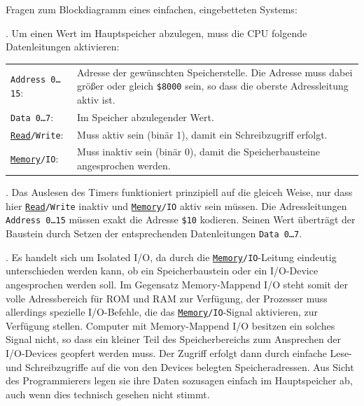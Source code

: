 
Fragen zum Blockdiagramm eines einfachen, eingebetteten Systems:

. Um einen Wert im Hauptspeicher abzulegen, muss die CPU folgende Datenleitungen
aktivieren:

{
    \renewcommand{\arraystretch}{1.5}
    \small

    \begin{tabularx}{\textwidth}{p{}X}
        \texttt{Address 0…15}:
        &
        Adresse der gewünschten Speicherstelle.
        Die Adresse muss dabei größer oder gleich \texttt{\$8000} sein, so dass
        die oberste Adressleitung aktiv ist.
        \\

        \texttt{Data 0…7}:
        &
        Im Speicher abzulegender Wert.
        \\

        \texttt{\underline{Read}/Write}:
        &
        Muss aktiv sein (binär 1), damit ein Schreibzugriff erfolgt.
        \\

        \texttt{\underline{Memory}/IO}:
        &
        Muss inaktiv sein (binär 0), damit die Speicherbausteine
        angesprochen werden.
        \\
    \end{tabularx}
}

. Das Auslesen des Timers funktioniert prinzipiell auf die gleiceh Weise, nur
dass hier \texttt{\underline{Read}/Write} inaktiv und \texttt{\underline{Memory}/IO}
aktiv sein müssen. Die Adressleitungen \texttt{Address 0…15} müssen exakt die
Adresse \texttt{\$10} kodieren. Seinen Wert überträgt der Baustein durch Setzen
der entsprechenden Datenleitungen \texttt{Data 0…7}.

. Es handelt sich um \glqq{}Isolated I/O\grqq{}, da durch die
\texttt{\underline{Memory}/IO}-Leitung eindeutig unterschieden werden kann,
ob ein Speicherbaustein oder ein I/O-Device angesprochen werden soll. Im Gegensatz
\glqq{}Memory-Mappend I/O\grqq{} steht somit der volle Adressbereich für ROM und
RAM zur Verfügung, der Prozesser muss allerdings spezielle I/O-Befehle, die das
\texttt{\underline{Memory}/IO}-Signal aktivieren, zur Verfügung stellen. Computer
mit \glqq{}Memory-Mappend I/O\grqq{} besitzen ein solches Signal nicht, so dass
ein kleiner Teil des Speicherbereichs zum Ansprechen der I/O-Devices geopfert
werden muss. Der Zugriff erfolgt dann durch einfache Lese- und Schreibzugriffe
auf die von den Devices belegten Speicheradressen. Aus Sicht des Programmierers
legen sie ihre Daten sozusagen einfach im Hauptspeicher ab, auch wenn dies
technisch gesehen nicht stimmt.

